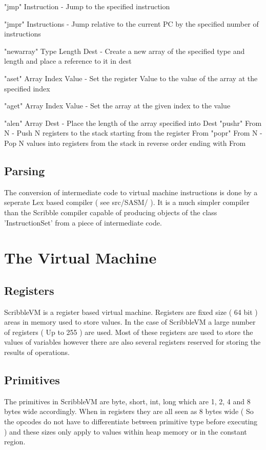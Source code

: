 \documentclass[]{final_report}
\begin{document}
"jmp" Instruction - Jump to the specified instruction

"jmpr" Instructions - Jump relative to the current PC by the specified number of instructions

"newarray" Type Length Dest - Create a new array of the specified type and length and place a reference to it in dest

"aset" Array Index Value - Set the register Value to the value of the array at the specified index

"aget" Array Index Value - Set the array at the given index to the value

"alen" Array Dest - Place the length of the array specified into Dest 
"pushr" From N - Push N registers to the stack starting from the register From
"popr" From N - Pop N values into registers from the stack in reverse order ending with From

\section{Parsing}

The conversion of intermediate code to virtual machine instructions is done by a seperate Lex based compiler ( see src/SASM/ ). It is a much simpler compiler than the Scribble compiler capable of producing objects of the class 'InstructionSet' from a piece of intermediate code.

\chapter{The Virtual Machine}

\section{Registers}

ScribbleVM is a register based virtual machine. Registers are fixed size ( 64 bit ) areas in memory used to
store values. In the case of ScribbleVM a large number of registers ( Up to 255 ) are used. Most of these
registers are used to store the values of variables however there are also several registers reserved for
storing the results of operations.

\section{Primitives}

The primitives in ScribbleVM are byte, short, int, long which are 1, 2, 4 and 8 bytes wide accordingly. When
in registers they are all seen as 8 bytes wide ( So the opcodes do not have to differentiate between primitive
type before executing ) and these sizes only apply to values within heap memory or in the constant region.
\end{document}
